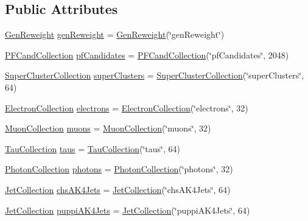 \subsection*{Public Attributes}
\begin{DoxyCompactItemize}
\item 
\hyperlink{classpanda_1_1GenReweight}{GenReweight} \hyperlink{classpanda_1_1Event_a30a3ce250e37a21cf8d280a728f45a9c}{genReweight} = \hyperlink{classpanda_1_1GenReweight}{GenReweight}(\char`\"{}genReweight\char`\"{})
\item 
\hyperlink{classpanda_1_1Collection}{PFCandCollection} \hyperlink{classpanda_1_1Event_a04384fcc6ea7375bdd7282f60030ae64}{pfCandidates} = \hyperlink{classpanda_1_1Collection}{PFCandCollection}(\char`\"{}pfCandidates\char`\"{}, 2048)
\item 
\hyperlink{classpanda_1_1Collection}{SuperClusterCollection} \hyperlink{classpanda_1_1Event_acb055eafe92e83b064dcbbba7140495f}{superClusters} = \hyperlink{classpanda_1_1Collection}{SuperClusterCollection}(\char`\"{}superClusters\char`\"{}, 64)
\item 
\hyperlink{classpanda_1_1Collection}{ElectronCollection} \hyperlink{classpanda_1_1Event_ae032ee07dd410e6ce3579e7e530c65f7}{electrons} = \hyperlink{classpanda_1_1Collection}{ElectronCollection}(\char`\"{}electrons\char`\"{}, 32)
\item 
\hyperlink{classpanda_1_1Collection}{MuonCollection} \hyperlink{classpanda_1_1Event_a1b49b3f3ef0dacbd407e5d473a5c014f}{muons} = \hyperlink{classpanda_1_1Collection}{MuonCollection}(\char`\"{}muons\char`\"{}, 32)
\item 
\hyperlink{classpanda_1_1Collection}{TauCollection} \hyperlink{classpanda_1_1Event_a40e09c3f99a6e0207d60413940ae1876}{taus} = \hyperlink{classpanda_1_1Collection}{TauCollection}(\char`\"{}taus\char`\"{}, 64)
\item 
\hyperlink{classpanda_1_1Collection}{PhotonCollection} \hyperlink{classpanda_1_1Event_a42e6ea0ac65285f9d35d47db092765c5}{photons} = \hyperlink{classpanda_1_1Collection}{PhotonCollection}(\char`\"{}photons\char`\"{}, 32)
\item 
\hyperlink{classpanda_1_1Collection}{JetCollection} \hyperlink{classpanda_1_1Event_a822814d60c0df55807b04a1489fc3783}{chsAK4Jets} = \hyperlink{classpanda_1_1Collection}{JetCollection}(\char`\"{}chsAK4Jets\char`\"{}, 64)
\item 
\hyperlink{classpanda_1_1Collection}{JetCollection} \hyperlink{classpanda_1_1Event_a95bbfc1588846edef19aa3eb3480deff}{puppiAK4Jets} = \hyperlink{classpanda_1_1Collection}{JetCollection}(\char`\"{}puppiAK4Jets\char`\"{}, 64)

\end{DoxyCompactItemize}
